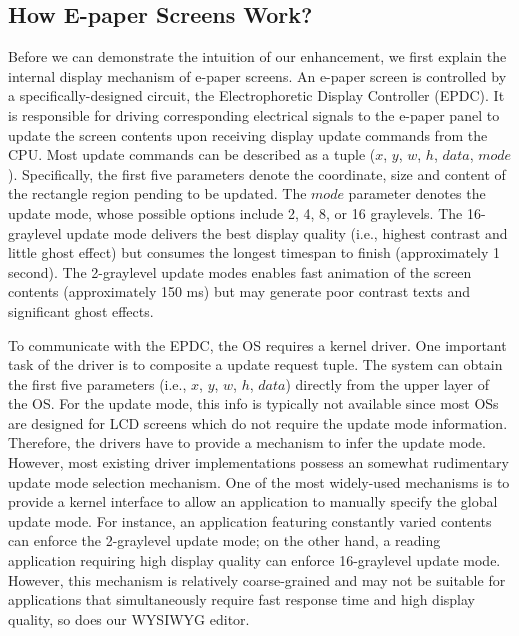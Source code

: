 \documentclass[]{sigchi}
\begin{document}
\subsection{How E-paper Screens Work?}
Before we can demonstrate the intuition of our enhancement, we first explain the internal display mechanism of e-paper screens.
An e-paper screen is controlled by a specifically-designed circuit, the Electrophoretic Display Controller (EPDC). It is responsible for driving corresponding electrical signals to the e-paper panel to update the screen contents upon receiving display update commands from the CPU. 
Most update commands can be described as a tuple ($x$, $y$, $w$, $h$, $data$, $mode$). Specifically, the first five parameters denote the coordinate, size and content of the rectangle region pending to be updated. The $mode$ parameter denotes the update mode, whose possible options include 2, 4, 8, or 16 graylevels. 
The 16-graylevel update mode delivers the best display quality (i.e., highest contrast and little ghost effect) but consumes the longest timespan to finish (approximately 1 second).
The 2-graylevel update modes enables fast animation of the screen contents (approximately 150 ms) but may generate poor contrast texts and significant ghost effects.


To communicate with the EPDC, the OS requires a kernel driver. 
One important task of the driver is to composite a update request tuple.
The system can obtain the first five parameters (i.e., $x$, $y$, $w$, $h$, $data$) directly from the upper layer of the OS.
For the update mode, this info is typically not available since most OSs are designed for LCD screens which do not require the update mode information.
Therefore, the drivers have to provide a mechanism to infer the update mode.
However, most existing driver implementations possess an somewhat rudimentary update mode selection mechanism.
One of the most widely-used mechanisms is to provide a kernel interface to allow an application to manually specify the global update mode.
For instance, an application featuring constantly varied contents can enforce the 2-graylevel update mode; on the other hand, a reading application requiring high display quality can enforce 16-graylevel update mode.
However, this mechanism is relatively coarse-grained and may not be suitable for applications that simultaneously require fast response time and high display quality, so does our WYSIWYG editor.
\end{document}
